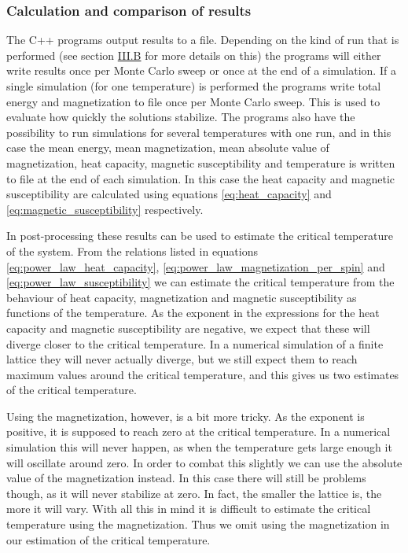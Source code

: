 \documentclass[reprint,english,notitlepage]{revtex4-1}  %
\begin{document}
\subsubsection{Calculation and comparison of results} \label{sec:III:a:iv}

The C++ programs output results to a file. Depending on the kind of run that is performed (see section \hyperref[sec:III:b]{III.B} for more details on this) the programs will either write results once per Monte Carlo sweep or once at the end of a simulation. If a single simulation (for one temperature) is performed the programs write total energy and magnetization to file once per Monte Carlo sweep. This is used to evaluate how quickly the solutions stabilize. The programs also have the possibility to run simulations for several temperatures with one run, and in this case the mean energy, mean magnetization, mean absolute value of magnetization, heat capacity, magnetic susceptibility and temperature is written to file at the end of each simulation. In this case the heat capacity and magnetic susceptibility are calculated using equations \eqref{eq:heat_capacity} and \eqref{eq:magnetic_susceptibility} respectively.

In post-processing these results can be used to estimate the critical temperature of the system. From the relations listed in equations \eqref{eq:power_law_heat_capacity}, \eqref{eq:power_law_magnetization_per_spin} and \eqref{eq:power_law_susceptibility} we can estimate the critical temperature from the behaviour of heat capacity, magnetization and magnetic susceptibility as functions of the temperature. As the exponent in the expressions for the heat capacity and magnetic susceptibility are negative, we expect that these will diverge closer to the critical temperature. In a numerical simulation of a finite lattice they will never actually diverge, but we still expect them to reach maximum values around the critical temperature, and this gives us two estimates of the critical temperature. 

Using the magnetization, however, is a bit more tricky. As the exponent is positive, it is supposed to reach zero at the critical temperature. In a numerical simulation this will never happen, as when the temperature gets large enough it will oscillate around zero. In order to combat this slightly we can use the absolute value of the magnetization instead. In this case there will still be problems though, as it will never stabilize at zero. In fact, the smaller the lattice is, the more it will vary. With all this in mind it is difficult to estimate the critical temperature using the magnetization. Thus we omit using the magnetization in our estimation of the critical temperature.
\end{document}
